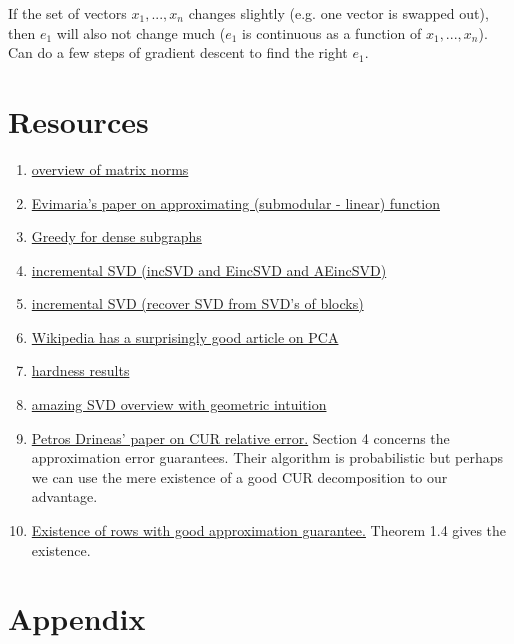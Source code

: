 \documentclass{article}
\begin{document}
If the set of vectors $x_1,...,x_n$ changes slightly (e.g. one vector is swapped out), then $e_1$ will also not change much ($e_1$ is continuous as a function of $x_1,...,x_n$). Can do a few steps of gradient descent to find the right $e_1$.

\section{Resources}
\begin{enumerate}
    \item \href{https://www.cis.upenn.edu/~cis515/cis515-11-sl4.pdf}{overview of matrix norms}
    \item \href{https://arxiv.org/pdf/2002.07782.pdf}{Evimaria's paper on approximating (submodular - linear) function}
    \item \href{https://users.ics.aalto.fi/gionis/greedy-dense.pdf}{Greedy for dense subgraphs}
    \item \href{https://ieeexplore.ieee.org/stamp/stamp.jsp?tp=&arnumber=8548605}{incremental SVD (incSVD and EincSVD and AEincSVD)}
    \item \href{https://arxiv.org/pdf/1601.07010.pdf}{incremental SVD (recover SVD from SVD's of blocks)}
    \item \href{https://en.wikipedia.org/wiki/Principal_component_analysis#Iterative_computation}{Wikipedia has a surprisingly good article on PCA}
    \item \href{https://www.semanticscholar.org/paper/The-intractability-of-computing-the-minimum-of-a-Vardy/2e0b89803e126a41e872f1d68eeb3e8eb71698c5}{hardness results}
    \item \href{https://www.cs.cmu.edu/~venkatg/teaching/CStheory-infoage/book-chapter-4.pdf}{amazing SVD overview with geometric intuition}
    \item \href{https://www.cs.purdue.edu/homes/pdrineas/documents/publications/Drineas_SIMAX_08b.pdf}{Petros Drineas' paper on CUR relative error.} Section 4 concerns the approximation error guarantees. Their algorithm is probabilistic but perhaps we can use the mere existence of a good CUR decomposition to our advantage.
    \item \href{https://www.theoryofcomputing.org/articles/v002a012/v002a012.pdf}{Existence of rows with good approximation guarantee.} Theorem 1.4 gives the existence.
\end{enumerate}

\printbibliography

\section{Appendix}
\end{document}
